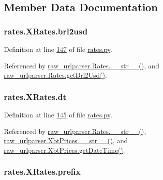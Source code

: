 \subsection{Member Data Documentation}
\subsubsection[{\texorpdfstring{brl2usd}{brl2usd}}]{\setlength{\rightskip}{0pt plus 5cm}rates.\+X\+Rates.\+brl2usd}\hypertarget{classrates_1_1_x_rates_acb0a8b6ec059b823c8a46eb115341251}{}\label{classrates_1_1_x_rates_acb0a8b6ec059b823c8a46eb115341251}


Definition at line \hyperlink{rates_8py_source_l00147}{147} of file \hyperlink{rates_8py_source}{rates.\+py}.



Referenced by \hyperlink{raw__urlparser_8py_source_l00038}{raw\+\_\+urlparser.\+Rates.\+\_\+\+\_\+str\+\_\+\+\_\+()}, and \hyperlink{raw__urlparser_8py_source_l00029}{raw\+\_\+urlparser.\+Rates.\+get\+Brl2\+Usd()}.

\subsubsection[{\texorpdfstring{dt}{dt}}]{\setlength{\rightskip}{0pt plus 5cm}rates.\+X\+Rates.\+dt}\hypertarget{classrates_1_1_x_rates_aa7835a0ac1d41af607d6d5885b49c131}{}\label{classrates_1_1_x_rates_aa7835a0ac1d41af607d6d5885b49c131}


Definition at line \hyperlink{rates_8py_source_l00145}{145} of file \hyperlink{rates_8py_source}{rates.\+py}.



Referenced by \hyperlink{raw__urlparser_8py_source_l00038}{raw\+\_\+urlparser.\+Rates.\+\_\+\+\_\+str\+\_\+\+\_\+()}, \hyperlink{raw__urlparser_8py_source_l00074}{raw\+\_\+urlparser.\+Xbt\+Prices.\+\_\+\+\_\+str\+\_\+\+\_\+()}, and \hyperlink{raw__urlparser_8py_source_l00059}{raw\+\_\+urlparser.\+Xbt\+Prices.\+get\+Date\+Time()}.

\subsubsection[{\texorpdfstring{prefix}{prefix}}]{\setlength{\rightskip}{0pt plus 5cm}rates.\+X\+Rates.\+prefix}\hypertarget{classrates_1_1_x_rates_a3b92b41b0fbd77b44d01f094ff83dd9d}{}\label{classrates_1_1_x_rates_a3b92b41b0fbd77b44d01f094ff83dd9d}


